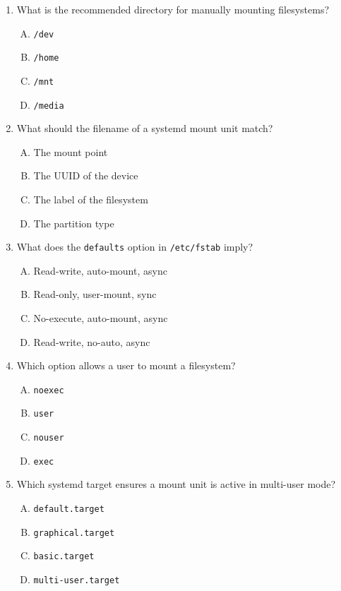 \documentclass[a4paper]{report}
\begin{document}
\begin{enumerate}[1.]
    \item What is the recommended directory for manually mounting filesystems?  
    \begin{enumerate}[A)]
        \item \texttt{/dev}  
        \item \texttt{/home}  
        \item \texttt{/mnt}  
        \item \texttt{/media}  
    \end{enumerate}

    \item What should the filename of a systemd mount unit match?  
    \begin{enumerate}[A)]
        \item The mount point  
        \item The UUID of the device  
        \item The label of the filesystem  
        \item The partition type  
    \end{enumerate}

    \item What does the \texttt{defaults} option in \texttt{/etc/fstab} imply?  
    \begin{enumerate}[A)]
        \item Read-write, auto-mount, async  
        \item Read-only, user-mount, sync  
        \item No-execute, auto-mount, async  
        \item Read-write, no-auto, async  
    \end{enumerate}

    \item Which option allows a user to mount a filesystem?  
    \begin{enumerate}[A)]
        \item \texttt{noexec}  
        \item \texttt{user}  
        \item \texttt{nouser}  
        \item \texttt{exec}  
    \end{enumerate}

    \item Which systemd target ensures a mount unit is active in multi-user mode?  
    \begin{enumerate}[A)]
        \item \texttt{default.target}  
        \item \texttt{graphical.target}  
        \item \texttt{basic.target}  
        \item \texttt{multi-user.target}  
    \end{enumerate}


\end{enumerate}
\end{document}
